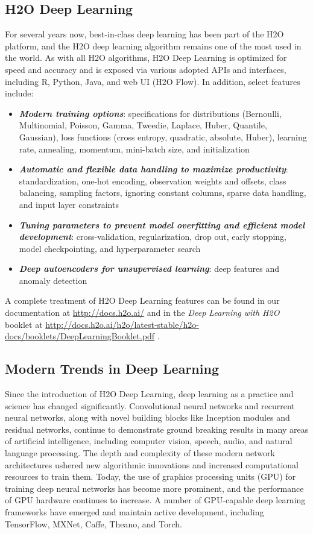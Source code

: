 	\subsection{H2O Deep Learning}
		For several years now, best-in-class deep learning has been part of the H2O platform, and the H2O deep learning algorithm remains one of the most used in the world.  As with all H2O algorithms, H2O Deep Learning is optimized for speed and accuracy and is exposed via various adopted APIs and interfaces, including R, Python, Java, and web UI (H2O Flow).  In addition, select features include:
		\begin{itemize}
			\item{\textbf{\textit{Modern training options}}}: specifications for distributions (Bernoulli, Multinomial, Poisson, Gamma, Tweedie, Laplace, Huber, Quantile, Gaussian), loss functions (cross entropy, quadratic, absolute, Huber), learning rate, annealing, momentum, mini-batch size, and initialization
			\item{\textbf{\textit{Automatic and flexible data handling to maximize productivity}}}: standardization, one-hot encoding, observation weights and offsets, class balancing, sampling factors, ignoring constant columns, sparse data handling, and input layer constraints
			\item{\textbf{\textit{Tuning parameters to prevent model overfitting and efficient model development}}}: cross-validation, regularization, drop out, early stopping, model checkpointing, and hyperparameter search
			\item{\textbf{\textit{Deep autoencoders for unsupervised learning}}}: deep features and anomaly detection
		\end{itemize}
		
		A complete treatment of H2O Deep Learning features can be found in our documentation at {\url{http://docs.h2o.ai/}} and in the \textit{Deep Learning with H2O} booklet at {\url{http://docs.h2o.ai/h2o/latest-stable/h2o-docs/booklets/DeepLearningBooklet.pdf}} {\cite{h2o_DL_booklet}}.
		
	\subsection{Modern Trends in Deep Learning}
		Since the introduction of H2O Deep Learning, deep learning as a practice and science has changed significantly.  Convolutional neural networks and recurrent neural networks, along with novel building blocks like Inception modules and residual networks, continue to demonstrate ground breaking results in many areas of artificial intelligence, including computer vision, speech, audio, and natural language processing.  The depth and complexity of these modern network architectures ushered new algorithmic innovations and increased computational resources to train them. Today, the use of graphics processing units (GPU) for training deep neural networks has become more prominent, and the performance of GPU hardware continues to increase.  A number of GPU-capable deep learning frameworks have emerged and maintain active development, including TensorFlow, MXNet, Caffe, Theano, and Torch.
	
